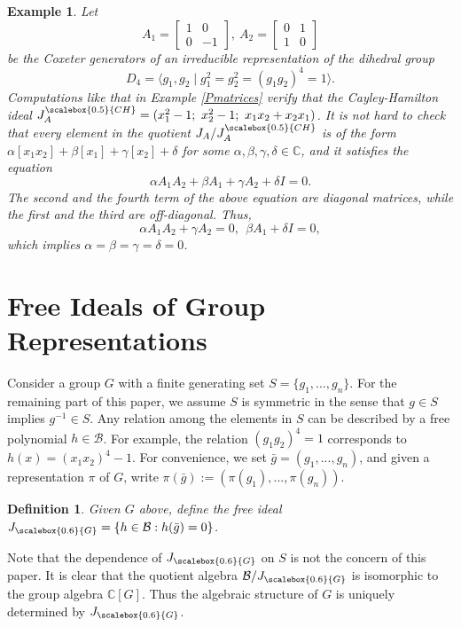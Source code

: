\documentclass[draft, 12pt, reqno]{amsart}
\newcommand{\C}{{\mathbb C}}
\newcommand{\B}{{\mathcal B}}
\numberwithin{equation}{section}
\theoremstyle{plain}
\newtheorem{example}[theorem]{Example}
\newtheorem{definition}[theorem]{Definition}
\begin{document}
\begin{example}\normalfont Let 
$$A_1=\left [ \begin{array}{cc} 1&0 \\0& -1 \end{array} \right ], \ A_2 =\left [ \begin{array}{cc} 0&1 \\1&0\end{array}\right ]$$
be the Coxeter generators of an irreducible representation of the dihedral group \[D_4=\langle g_1, g_2\mid g_1^2=g_2^2=(g_1g_2)^4=1\rangle.\] Computations like that in Example \ref{Pmatrices} verify that the Cayley-Hamilton ideal $J_A^{\scalebox{0.5}{CH}}=(x_1^2-1 ; \ x_2^2-1; \ x_1x_2+x_2x_1)$. It is not hard to check that every element in the quotient $J_A/J_A^{\scalebox{0.5}{CH}}$ is of the form $\alpha [x_1x_2]+\beta [x_1]+\gamma [x_2] +\delta $
for some $\alpha, \beta, \gamma, \delta \in \C$, and it satisfies the equation
$$\alpha  A_1A_2 +\beta A_1+ \gamma A_2 +\delta  I=0. $$
The second and the fourth term of the above equation are diagonal matrices, while the first and the third are off-diagonal. Thus,
$$\alpha A_1A_2 +\gamma A_2=0, \ \ \beta A_1 + \delta I=0, $$ 
which implies $\alpha=\beta=\gamma=\delta=0$.
\end{example}

\section{Free Ideals of Group Representations}\label{group ideals}

Consider a group $G$ with a finite generating set $S=\{g_1, ..., g_n\}$. For the remaining part of this paper, we assume $S$ is symmetric in the sense that $g\in S$ implies $g^{-1}\in S$. Any relation among the elements in $S$ can be described by a free polynomial $h\in \B$. For example, the relation $(g_1g_2)^4=1$ corresponds to $h(x)=(x_1x_2)^4-1$. For convenience, we set $\bar{g}=(g_1, ..., g_n)$, and given a representation $\pi$ of $G$, write $\pi(\bar{g}):=(\pi(g_1),..., \pi (g_n))$.

\begin{definition}
Given $G$ above, define the free ideal $J_{\scalebox{0.6}{G}}=\{h\in \B: h(\bar{g})=0\}$.
\end{definition}
\noindent Note that the dependence of $J_{\scalebox{0.6}{G}}$ on $S$ is not the concern of this paper. It is clear that the quotient algebra $\B/J_{\scalebox{0.6}{G}}$ is isomorphic to the group algebra $\C[G]$. Thus the algebraic structure of $G$ is uniquely determined by $J_{\scalebox{0.6}{G}}$.
\end{document}
